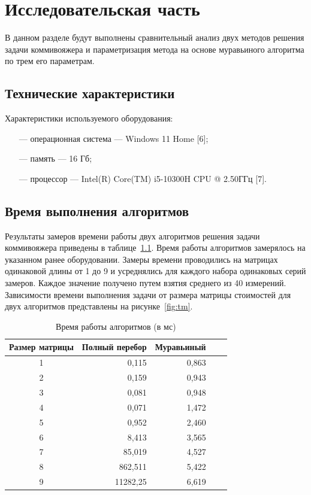 \chapter{Исследовательская часть}
В данном разделе будут выполнены сравнительный анализ двух методов решения задачи коммивояжера и параметризация метода на основе муравьиного алгоритма по трем его параметрам.

\section{Технические характеристики}
Характеристики используемого оборудования:
\begin{itemize}
    \item[---] операционная система --- Windows 11 Home [6];
    \item[---] память --- 16 Гб;
    \item[---] процессор --- Intel(R) Core(TM) i5-10300H CPU @ 2.50ГГц [7].
\end{itemize}

\section{Время выполнения алгоритмов}
Результаты замеров времени работы двух алгоритмов решения задачи коммивояжера приведены в таблице~\ref{tbl:time_measurements}. Время работы алгоритмов замерялось на указанном ранее оборудовании. Замеры времени проводились на матрицах одинаковой длины от 1 до 9 и усреднялись для каждого набора одинаковых серий замеров. Каждое значение получено путем взятия среднего из 40 измерений. Зависимости времени выполнения задачи от размера матрицы стоимостей для двух алгоритмов представлены на рисунке~\ref{fig:tm}.
\clearpage

\begin{table}[h]
	\begin{center}
		\begin{threeparttable}
		\captionsetup{justification=raggedright,singlelinecheck=off}
		\caption{Время работы алгоритмов (в мс)}
		\label{tbl:time_measurements}
		\begin{tabular}{|c|r|r|r|r|}
			\hline
			Размер матрицы &  Полный перебор & Муравьиный \\
            \hline
			1    & 0,115 & 0,863 \\
            \hline
			2    & 0,159 & 0,943 \\ 
            \hline
			3    & 0,081 & 0,948 \\ 
            \hline
			4    & 0,071 & 1,472 \\ 
			\hline
			5    & 0,952 & 2,460 \\ 
			\hline
			6    & 8,413 & 3,565 \\ 
			\hline
			7    & 85,019 & 4,527 \\ 
			\hline
			8    & 862,511 & 5,422 \\ 
			\hline
			9    & 11282,25 & 6,619 \\ 
            \hline
		\end{tabular}
		\end{threeparttable}
    \end{center}
\end{table}

